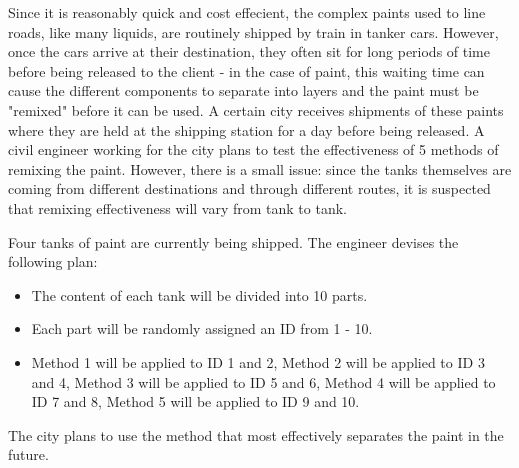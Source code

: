 \documentclass{examsetup}
\begin{document}
\begin{questions}
Since it is reasonably quick and cost effecient, the complex paints used to line roads, like many liquids, are routinely shipped by train in tanker cars.
However, once the cars arrive at their destination, they often sit for long periods of time before being released to the client - in the case of paint, this waiting time can cause the different components to separate into layers and the paint must be "remixed" before it can be used.
A certain city receives shipments of these paints where they are held at the shipping station for a day before being released.
A civil engineer working for the city plans to test the effectiveness of 5 methods of remixing the paint.
However, there is a small issue: since the tanks themselves are coming from different destinations and through different routes, it is suspected that remixing effectiveness will vary from tank to tank.

Four tanks of paint are currently being shipped. The engineer devises the following plan:

\begin{itemize}
   \item The content of each tank will be divided into 10 parts.
   \item Each part will be randomly assigned an ID from 1 - 10.
   \item Method 1 will be applied to ID 1 and 2, Method 2 will be applied to ID 3 and 4, Method 3 will be applied to ID 5 and 6, Method 4 will be applied to ID 7 and 8, Method 5 will be applied to ID 9 and 10.
\end{itemize}

The city plans to use the method that most effectively separates the paint in the future.


\end{questions}
\end{document}
